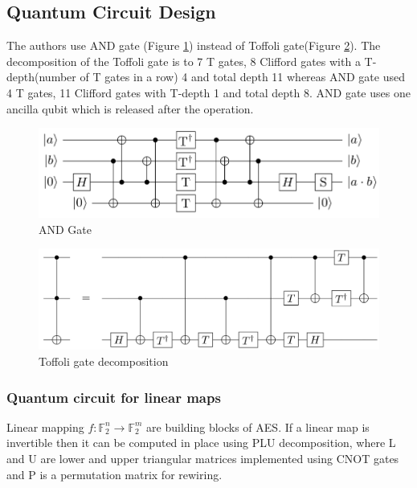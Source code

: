 \documentclass[preprint]{transcrypto}
\begin{document}
\subsection{Quantum Circuit Design}

The authors use AND gate (Figure \ref{fig:and}) instead of Toffoli gate(Figure \ref{fig:toff}). The decomposition of the Toffoli gate is to 7 T gates, 8 Clifford gates with a T-depth(number of T gates in a row\cite{stack}) 4 and total depth 11 whereas AND gate used 4 T gates, 11 Clifford gates with T-depth 1 and total depth 8. AND gate uses one ancilla qubit which is released after the operation.


\begin{figure}[h!]
    \centering
    \includegraphics[width=\linewidth]{aes/and.png}
    \caption{AND Gate \cite{aeslowmc}}
    \label{fig:and}
\end{figure}

\begin{figure}[h!]
    \centering
    \includegraphics[width=\linewidth]{aes/toffoli.png}
    \caption{Toffoli gate decomposition\cite{wiki:toff}}
    \label{fig:toff}
\end{figure}

\subsubsection{Quantum circuit for linear maps}
Linear mapping $f:\mathbb{F}_2^n \rightarrow \mathbb{F}_2^m$ are building blocks of AES. If a linear map is invertible then it can be computed in place using PLU decomposition, where L and U are lower and upper triangular matrices implemented using CNOT gates and P is a permutation matrix for rewiring.
\end{document}
